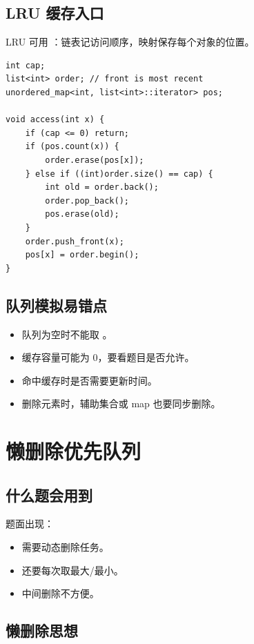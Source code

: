 \subsection{LRU 缓存入口}

LRU 可用 ：链表记访问顺序，映射保存每个对象的位置。

\begin{lstlisting}
int cap;
list<int> order; // front is most recent
unordered_map<int, list<int>::iterator> pos;

void access(int x) {
    if (cap <= 0) return;
    if (pos.count(x)) {
        order.erase(pos[x]);
    } else if ((int)order.size() == cap) {
        int old = order.back();
        order.pop_back();
        pos.erase(old);
    }
    order.push_front(x);
    pos[x] = order.begin();
}
\end{lstlisting}

\subsection{队列模拟易错点}

\begin{itemize}
  \item 队列为空时不能取 。
  \item 缓存容量可能为 0，要看题目是否允许。
  \item 命中缓存时是否需要更新时间。
  \item 删除元素时，辅助集合或 map 也要同步删除。
\end{itemize}

\section{懒删除优先队列}\label{sec:07-24}

\subsection{什么题会用到}

题面出现：

\begin{itemize}
  \item 需要动态删除任务。
  \item 还要每次取最大/最小。
  \item {} 中间删除不方便。
\end{itemize}

\subsection{懒删除思想}

